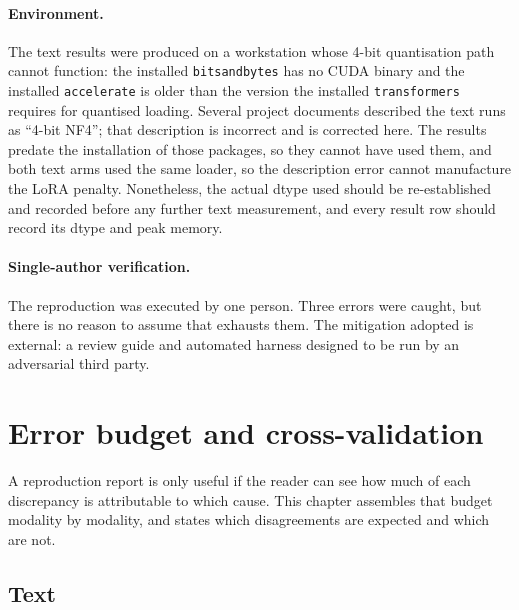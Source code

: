 \documentclass[11pt,a4paper]{article}
\newcommand{\code}[1]{\texttt{\small #1}}
\begin{document}
\paragraph{Environment.} The text results were produced on a workstation whose
4-bit quantisation path cannot function: the installed \code{bitsandbytes} has no
CUDA binary and the installed \code{accelerate} is older than the version the
installed \code{transformers} requires for quantised loading. Several project
documents described the text runs as ``4-bit NF4''; that description is incorrect
and is corrected here. The results predate the installation of those packages, so
they cannot have used them, and both text arms used the same loader, so the
description error cannot manufacture the LoRA penalty. Nonetheless, the actual
dtype used should be re-established and recorded before any further text
measurement, and every result row should record its dtype and peak memory.

\paragraph{Single-author verification.} The reproduction was executed by one
person. Three errors were caught, but there is no reason to assume that exhausts
them. The mitigation adopted is external: a review guide and automated harness
designed to be run by an adversarial third party.


\section{Error budget and cross-validation}
\label{ch:budget}

A reproduction report is only useful if the reader can see how much of each
discrepancy is attributable to which cause. This chapter assembles that budget
modality by modality, and states which disagreements are expected and which are
not.

\subsection{Text}
\end{document}
